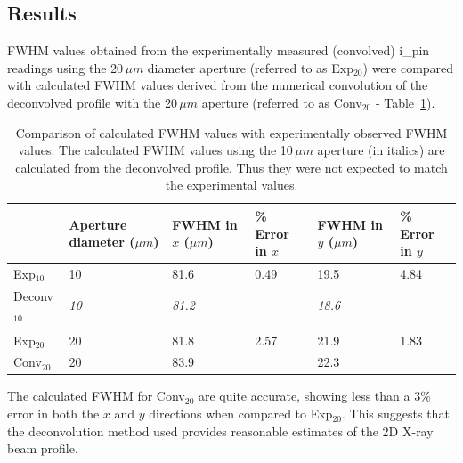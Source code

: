 \subsection{Results}
\label{sub:Results - DLS}
FWHM values obtained from the experimentally measured (convolved) i\_pin readings using the 20$\,\mu m$ diameter aperture (referred to as Exp$_{\text{20}}$) were compared with calculated FWHM values derived from the numerical convolution of the deconvolved profile with the 20$\,\mu m$ aperture (referred to as Conv$_{\text{20}}$ - Table~\ref{tab:FWHM comparison - DLS}).
\begin{table}[h!]
	\caption[Comparison of calculated FWHM values with experimentally observed FWHM values.]{Comparison of calculated FWHM values with experimentally observed FWHM values.
    The calculated FWHM values using the 10$\,\mu m$ aperture (in italics) are calculated from the deconvolved profile.
    Thus they were not expected to match the experimental values.}
	\begin{tabular}{p{2.5cm} p{2.5cm} p{2cm} p{1.5cm} p{2cm} p{1.5cm}}
        &  Aperture diameter ($\mu m$) & FWHM in $x$ ($\mu m$) 	&	\% Error in $x$		& FWHM in $y$ ($\mu m$) 	&	\% Error in $y$ \\
		\hline
		Exp$_{\text{10}}$         & 10              & 81.6 	            &	0.49      & 19.5 	        & 4.84	\\
		Deconv$_{\text{10}}$      & \textit{10}     & \textit{81.2}     &  	          & \textit{18.6} 	&		\\
                                  &                 &			        &			  &    		        &		\\
        Exp$_{\text{20}}$         & 20              & 81.8              &   2.57      & 21.9            & 1.83  \\
		Conv$_{\text{20}}$        & 20              & 83.9              &             & 22.3            &    	\\
	\end{tabular}
	\label{tab:FWHM comparison - DLS}
\end{table}
The calculated FWHM for Conv$_{\text{20}}$ are quite accurate, showing less than a 3\% error in both the $x$ and $y$ directions when compared to Exp$_{\text{20}}$.
This suggests that the deconvolution method used provides reasonable estimates of the 2D X-ray beam profile.

